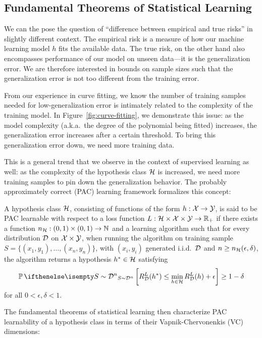 \subsection{Fundamental Theorems of Statistical Learning}

We can the pose the question of ``difference between empirical and true risks''
in slightly different context. The empirical risk is a measure of how our
machine learning model $h$ fits the available data. The true risk, on the other
hand also encompasses performance of our model on unseen data---it is the
generalization error. We are therefore interested in bounds on sample sizes such
that the generalization error is not too different from the training error.

From our experience in curve fitting, we know the number of training samples
needed for low-generalization error is intimately related to the complexity of
the training model. In Figure~\ref{fig:curve-fitting}, we demonstrate this
issue: as the model complexity (a.k.a.\ the degree of the polynomial being
fitted) increases, the generalization error increases after a certain threshold.
To bring this generalization error down, we need more training data.

This is a general trend that we observe in the context of supervised learning as
well: as the complexity of the hypothesis class $\mathcal{H}$ is increased, we need more
training samples to pin down the generalization behavior. The probably
approximately correct (PAC) learning framework formalizes this concept:

\begin{definition}
  A hypothesis class $\mathcal{H}$, consisting of functions of the form $h : \mathcal{X} \to
  \mathcal{Y}$, is said to be PAC learnable with respect to a loss function $L : \mathcal{H}
  \times \mathcal{X} \times \mathcal{Y} \to \mathbb{R}_+$ if there exists a function $n_{\mathcal{H}} : (0, 1)
  \times (0, 1) \to \mathbb{N}$ and a learning algorithm such that for every
  distribution $\mathcal{D}$ on $\mathcal{X} \times \mathcal{Y}$, when running the algorithm on training
  sample $S = \{(x_1, y_1), \ldots, (x_n, y_n)\}$, with $(x_i, y_i)$ generated
  i.i.d.\ $\mathcal{D}$ and $n \geq n_{\mathcal{H}}(\epsilon, \delta)$, the algorithm returns a
  hypothesis $h^* \in \mathcal{H}$ satisfying
  \begin{equation}
    \Pr[S \sim \CD^n]{R_\CD^L(h^*) \leq \min_{h \in \CH} R_\CD^L(h) + \epsilon}
    \geq 1 - \delta
  \end{equation}
  for all $0 < \epsilon, \delta < 1$.
\end{definition}

The fundamental theorems of statistical learning then characterize PAC
learnability of a hypothesis class in terms of their Vapnik-Chervonenkis (VC)
dimensions:

